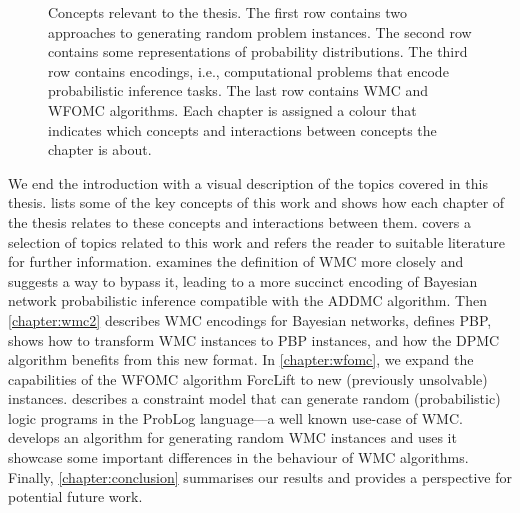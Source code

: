 \begin{figure}[t]
  \caption{Concepts relevant to the thesis. The first row contains two
    approaches to generating random problem instances. The second row contains
    some representations of probability distributions. The third row contains
    encodings, i.e., computational problems that encode probabilistic inference
    tasks. The last row contains WMC and WFOMC algorithms. Each chapter is
    assigned a colour that indicates which concepts and interactions between
    concepts the chapter is about.}\label{fig:overview}
\end{figure}

We end the introduction with a visual description of the topics covered in this
thesis.  lists some of the key concepts of this work and
shows how each chapter of the thesis relates to these concepts and interactions
between them.  covers a selection of topics related to
this work and refers the reader to suitable literature for further information.
 examines the definition of WMC more closely and suggests a
way to bypass it, leading to a more succinct encoding of Bayesian network
probabilistic inference compatible with the ADDMC algorithm. Then
\cref{chapter:wmc2} describes WMC encodings for Bayesian networks, defines PBP,
shows how to transform WMC instances to PBP instances, and how the DPMC
algorithm benefits from this new format. In \cref{chapter:wfomc}, we expand the
capabilities of the WFOMC algorithm ForcLift to new (previously unsolvable)
instances.  describes a constraint model that can
generate random (probabilistic) logic programs in the ProbLog
\citep{DBLP:conf/ijcai/RaedtKT07} language---a well known use-case of WMC\@.
 develops an algorithm for generating random WMC
instances and uses it showcase some important differences in the behaviour of
WMC algorithms. Finally, \cref{chapter:conclusion} summarises our results and
provides a perspective for potential future work.
